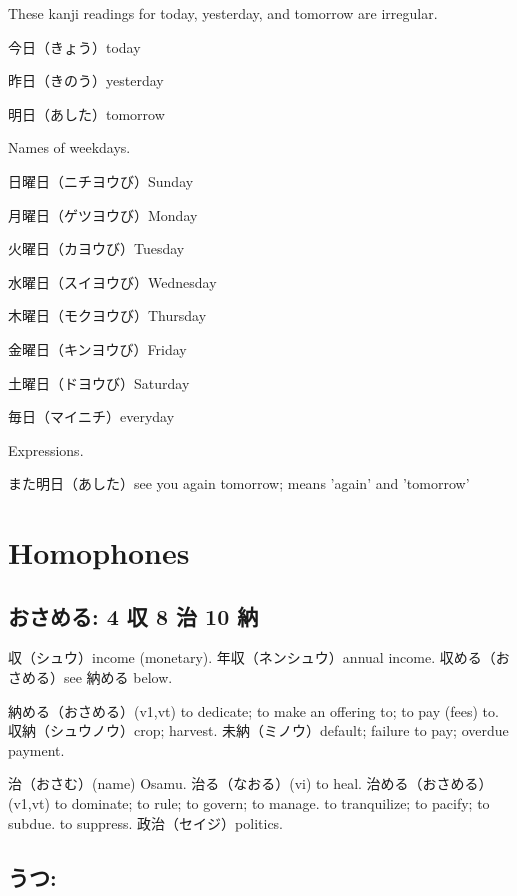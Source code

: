 These kanji readings for today, yesterday, and tomorrow are irregular.

今日（きょう）today

昨日（きのう）yesterday

明日（あした）tomorrow

Names of weekdays.

日曜日（ニチヨウび）Sunday

月曜日（ゲツヨウび）Monday

火曜日（カヨウび）Tuesday

水曜日（スイヨウび）Wednesday

木曜日（モクヨウび）Thursday

金曜日（キンヨウび）Friday

土曜日（ドヨウび）Saturday

毎日（マイニチ）everyday

Expressions.

また明日（あした）see you again tomorrow; means 'again' and 'tomorrow'

\section{Homophones}

\subsection{おさめる: 4 収 8 治 10 納}

収（シュウ）income (monetary).
年収（ネンシュウ）annual income.
収める（おさめる）see 納める below.

納める（おさめる）(v1,vt)
to dedicate; to make an offering to; to pay (fees) to.
収納（シュウノウ）crop; harvest.
未納（ミノウ）default; failure to pay; overdue payment.

治（おさむ）(name) Osamu.
治る（なおる）(vi) to heal.
治める（おさめる）(v1,vt)
to dominate; to rule; to govern; to manage.
to tranquilize; to pacify; to subdue.
to suppress.
政治（セイジ）politics.

\subsection{うつ:}
